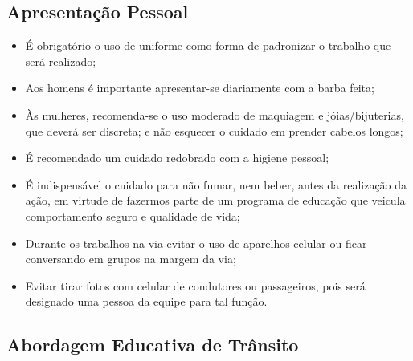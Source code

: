 \subsection{Apresentação Pessoal}

\begin{itemize}
\item É obrigatório o uso de uniforme como forma de padronizar o trabalho que será realizado;
\item Aos homens é importante apresentar-se diariamente com a barba feita;
\item Às mulheres, recomenda-se o uso moderado de maquiagem e jóias/bijuterias, que deverá ser discreta; e não esquecer o cuidado em prender cabelos longos;
\item É recomendado um cuidado redobrado com a higiene pessoal;
\item É indispensável o cuidado para não fumar, nem beber, antes da realização da ação, em virtude de fazermos parte de um programa de educação que veicula comportamento seguro e qualidade de vida;
\item Durante os trabalhos na via evitar o uso de aparelhos celular ou ficar conversando em grupos na margem da via;
\item Evitar tirar fotos com celular de condutores ou passageiros, pois será designado uma pessoa da equipe para tal função.
\end{itemize}








\subsection{Abordagem Educativa de Trânsito}

